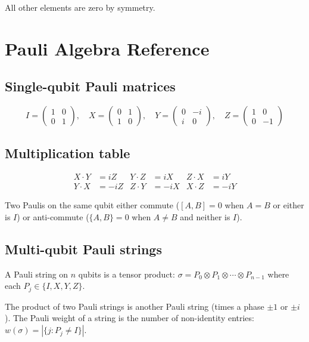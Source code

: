 \documentclass[aps,prb,preprint,longbibliography,nofootinbib]{revtex4-2}
\begin{document}
All other elements are zero by symmetry.

\section{Pauli Algebra Reference}
\label{app:pauli}

\subsection{Single-qubit Pauli matrices}
\begin{equation}
I = \begin{pmatrix} 1 & 0 \\ 0 & 1 \end{pmatrix},\quad
X = \begin{pmatrix} 0 & 1 \\ 1 & 0 \end{pmatrix},\quad
Y = \begin{pmatrix} 0 & -i \\ i & 0 \end{pmatrix},\quad
Z = \begin{pmatrix} 1 & 0 \\ 0 & -1 \end{pmatrix}
\end{equation}

\subsection{Multiplication table}
\begin{align}
X \cdot Y &= iZ  & Y \cdot Z &= iX  & Z \cdot X &= iY \\
Y \cdot X &= -iZ & Z \cdot Y &= -iX & X \cdot Z &= -iY
\end{align}

Two Paulis on the same qubit either commute ($[A,B] = 0$ when $A = B$
or either is $I$) or anti-commute ($\{A,B\} = 0$ when $A \neq B$ and
neither is $I$).

\subsection{Multi-qubit Pauli strings}

A Pauli string on $n$ qubits is a tensor product:
$\sigma = P_0 \otimes P_1 \otimes \cdots \otimes P_{n-1}$ where each
$P_j \in \{I, X, Y, Z\}$.

The product of two Pauli strings is another Pauli string (times a phase
$\pm 1$ or $\pm i$).  The Pauli weight of a string is the number of
non-identity entries:
$w(\sigma) = |\{j : P_j \neq I\}|$.


\end{document}
